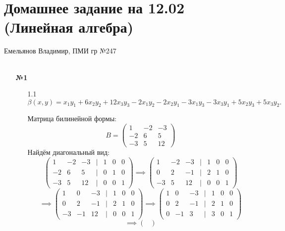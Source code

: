\documentclass[a4paper]{article}
\begin{document}
\section*{Домашнее задание на 12.02 (Линейная алгебра)}
 {\large Емельянов Владимир, ПМИ гр №247}\\\\
\begin{enumerate}
    \item[\textbf{№1}]
    \begin{enumerate}
        \item[1.1]
        $
        \beta(x, y) = x_{1} y_{1} + 6 x_{2} y_{2} + 12 x_{3} y_{3} 
        - 2 x_{1} y_{2} - 2 x_{2} y_{1} - 3 x_{1} y_{3} - 3 x_{3} y_{1}
        + 5 x_{2} y_{3} + 5 x_{3} y_{2}.
        $

        Матрица билинейной формы:
        $$
        B = 
        \begin{pmatrix}
        1 & -2 & -3 \\
        -2 & 6 & 5 \\
        -3 & 5 & 12
        \end{pmatrix}
        $$
        Найдём диагональный вид:
        $$\begin{pmatrix}
            1 & -2 & -3 & | & 1 &0 & 0\\
            -2 & 6 & 5 &| & 0 & 1& 0\\
            -3 & 5 & 12 & | & 0 & 0 & 1
            \end{pmatrix} \implies \begin{pmatrix}
                1 & -2 & -3 & | & 1 &0 & 0\\
                0 & 2 & -1 &| & 2 & 1& 0\\
                -3 & 5 & 12 & | & 0 & 0 & 1
                \end{pmatrix} $$
        $$
        \implies \begin{pmatrix}
            1 & 0 & -3 & | & 1 &0 & 0\\
            0 & 2 & -1 &| & 2 & 1& 0\\
            -3 & -1 & 12 & | & 0 & 0 & 1
            \end{pmatrix}\implies \begin{pmatrix}
                1 & 0 & -3 & | & 1 &0 & 0\\
                0 & 2 & -1 &| & 2 & 1& 0\\
                0 & -1 & 3 & | & 3 & 0 & 1
                \end{pmatrix}$$
        $$\implies \begin{pmatrix}

\end{pmatrix}$$
\end{enumerate}
\end{enumerate}
\end{document}
